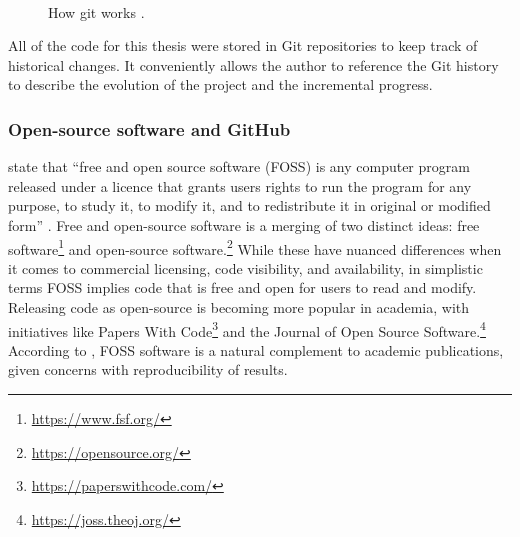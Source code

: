 \documentclass[report.tex]{subfiles}
\begin{document}
\begin{figure}[ht]
	\centering
	\\
	\caption{How git works \parencite[6, 8]{gitbook}.}
	\label{fig:git}
\end{figure}

All of the code for this thesis were stored in Git repositories to keep track of historical changes. It conveniently allows the author to reference the Git history to describe the evolution of the project and the incremental progress.

\subsubsection{Open-source software and GitHub}
\label{sec:ossgithub}

\citeauthor{floss} state that ``free and open source software (FOSS) is any computer program released under a licence that grants users rights to run the program for any purpose, to study it, to modify it, and to redistribute it in original or modified form'' \parencite[1]{floss}. Free and open-source software is a merging of two distinct ideas: free software\footnote{\url{https://www.fsf.org/}} and open-source software.\footnote{\url{https://opensource.org/}} While these have nuanced differences when it comes to commercial licensing, code visibility, and availability, in simplistic terms FOSS implies code that is free and open for users to read and modify. Releasing code as open-source is becoming more popular in academia, with initiatives like Papers With Code\footnote{\url{https://paperswithcode.com/}} and the Journal of Open Source Software.\footnote{\url{https://joss.theoj.org/}} According to \textcite{floss}, FOSS software is a natural complement to academic publications, given concerns with reproducibility of results.
\end{document}

